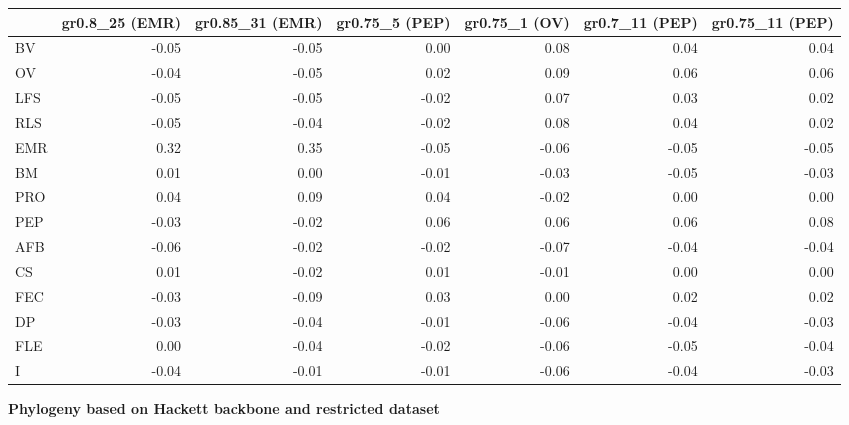 \begin{landscape}
\begin{table}
\begin{footnotesize}
\begin{tabular}{@{}l|rrrrrr@{}}
\toprule
  & gr0.8\_25 (EMR) & gr0.85\_31 (EMR) & gr0.75\_5 (PEP) & gr0.75\_1 (OV) & gr0.7\_11 (PEP) & gr0.75\_11 (PEP)\\
\midrule
BV & -0.05 & -0.05 & 0.00 & 0.08 & 0.04 & 0.04\\
OV & -0.04 & -0.05 & 0.02 & 0.09 & 0.06 & 0.06\\
LFS & -0.05 & -0.05 & -0.02 & 0.07 & 0.03 & 0.02\\
RLS & -0.05 & -0.04 & -0.02 & 0.08 & 0.04 & 0.02\\
EMR & 0.32 & 0.35 & -0.05 & -0.06 & -0.05 & -0.05\\
BM & 0.01 & 0.00 & -0.01 & -0.03 & -0.05 & -0.03\\
PRO & 0.04 & 0.09 & 0.04 & -0.02 & 0.00 & 0.00\\
PEP & -0.03 & -0.02 & 0.06 & 0.06 & 0.06 & 0.08\\
AFB & -0.06 & -0.02 & -0.02 & -0.07 & -0.04 & -0.04\\
CS & 0.01 & -0.02 & 0.01 & -0.01 & 0.00 & 0.00\\
FEC & -0.03 & -0.09 & 0.03 & 0.00 & 0.02 & 0.02\\
DP & -0.03 & -0.04 & -0.01 & -0.06 & -0.04 & -0.03\\
FLE & 0.00 & -0.04 & -0.02 & -0.06 & -0.05 & -0.04\\
I & -0.04 & -0.01 & -0.01 & -0.06 & -0.04 & -0.03\\
\bottomrule
\end{tabular}

\textbf{Phylogeny based on Hackett backbone and restricted dataset}


\end{footnotesize}
\end{table}
\end{landscape}
